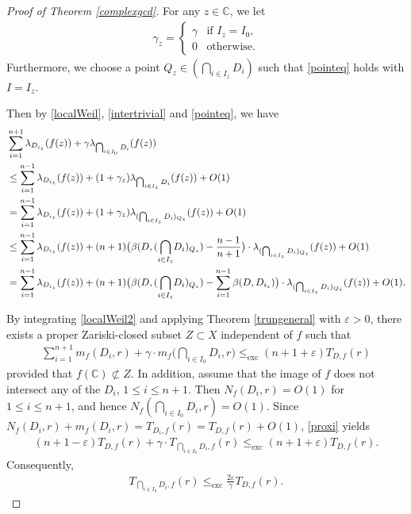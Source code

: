 \documentclass[10pt]{amsart}
\numberwithin{equation}{section}
\theoremstyle{plain}
\theoremstyle{definition}
\begin{document}
\begin{proof}[Proof of Theorem \ref{complexgcd}]
 For any $z\in \mathbb C$, we let
 \begin{align*}
 \gamma_z=
 \begin{cases}
 \gamma & \text{if } I_z=I_0,\\
 0 & \text{otherwise}.
 \end{cases}
 \end{align*}
 Furthermore, we choose a point
$Q_z \in   \left( \bigcap_{i \in I_z} D_i \right)$
such that \eqref{pointeq} holds with $I = I_z$.


Then by \eqref{localWeil},  \eqref{intertrivial} and \eqref{pointeq}, we have 
\begin{align}\label{localWeil2}
& \sum_{i=1}^{n+1}\lambda_{ D_{i_z}}(f(z))+\gamma\lambda_{\bigcap_{i\in I_0}   D_{i}}(f(z))\notag\\
 &\le \sum_{i=1}^{n-1}\lambda_{D_{i_z}}(f(z)) + (1+\gamma_z)   \lambda_{\bigcap_{i \in I_z} D_{i} } (f(z))+O(1)\notag\\
 &= \sum_{i=1}^{n-1}\lambda_{D_{i_z}}(f(z))+(1+\gamma_z)  \lambda_{(\bigcap_{i \in I_z} D_{i})_{Q_z}}( f(z))+O(1)\notag\\
 &\le \sum_{i=1}^{n-1}\lambda_{D_{i_z}}(f(z)) + (n+1) \big(  \beta(D, ({\bigcap_{i \in I_z } }D_{i})_{Q_z}) -
 \frac{ n-1}{n+1} \big)\cdot \lambda_{(\bigcap_{i \in I_z} D_{i})_{ Q_z}}( f(z))+O(1)\notag\\
 & = \sum_{i=1}^{n-1} \lambda_{D_{i_z}}(f(z))  
 + (n+1) \big(  \beta(D, ({\bigcap_{i \in I_z } }D_{i})_{Q_z}) -\sum_{i=1}^{n-1}\beta(D, D_{i_z})  \big)\cdot \lambda_{(\bigcap_{i \in I_z} D_{i})_{ Q_z}}(f(z)) +O(1).
\end{align}

By integrating \eqref{localWeil2} and applying  Theorem \ref{trungeneral} with $\varepsilon>0$,  there exists a proper  Zariski-closed subset $Z\subset X$ independent of $f$ such that  
\begin{align}\label{proxi}
  \sum_{i=1}^{n+1}m_f(D_i,r)  +\gamma\cdot m_f\bigg({\bigcap_{i\in I_0}   D_{i}},r\bigg)   
    \leq_{\operatorname{exc}} (n+1+\varepsilon)T_{D,f}(r) 
\end{align}
provided that $f(\mathbb{C})\not\subset Z$.
In addition, assume that the image of $f$ does not intersect  any of the $D_i$, $1\le i\le n+1$.
Then  $N_f(D_i,r) =O(1)$ for  $1\le i\le n+1$, and hence $N_f({\bigcap_{i\in I_0}  } D_{i},r) =O(1)$.
Since $N_f(D_i,r)+ m_f(D_i,r) =T_{D_i,f}(r)=T_{D,f}(r)+O(1)$,
 \eqref{proxi} yields
\begin{align}\label{ht}
(n+1-\varepsilon)T_{D,f}(r)   +\gamma\cdot T_{{\bigcap_{i\in I_0}}   D_{i},f}(r)   
    \leq_{\operatorname{exc}} (n+1+\varepsilon)T_{D,f}(r).
\end{align}
Consequently,
\begin{align*} 
 T_{{\bigcap_{i\in I_0} }  D_{i},f}(r)   
    \leq_{\operatorname{exc}} \frac{2\varepsilon}{\gamma} T_{D,f}(r).
\end{align*}
 \end{proof}
\end{document}
